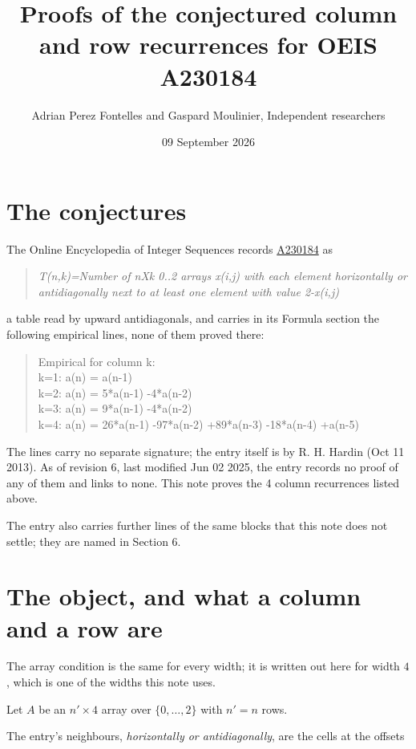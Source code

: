 \documentclass[11pt]{article}
\title{Proofs of the conjectured column and row recurrences for OEIS A230184}
\author{Adrian Perez Fontelles and Gaspard Moulinier, Independent researchers}
\date{09 September 2026}
\theoremstyle{definition}
\begin{document}
\maketitle
\section{The conjectures}

The Online Encyclopedia of Integer Sequences records \href{https://oeis.org/A230184}{A230184} as

\begin{quote}\itshape T(n,k)=Number of nXk 0..2 arrays x(i,j) with each element horizontally or antidiagonally next to at least one element with value 2-x(i,j)\end{quote}

a table read by upward antidiagonals, and carries in its Formula section the following empirical lines, none of them proved there:

\begin{quote}\ttfamily Empirical for column k:\\
k=1: a(n) = a(n-1)\\k=2: a(n) = 5*a(n-1) -4*a(n-2)\\k=3: a(n) = 9*a(n-1) -4*a(n-2)\\k=4: a(n) = 26*a(n-1) -97*a(n-2) +89*a(n-3) -18*a(n-4) +a(n-5)\end{quote}

The lines carry no separate signature; the entry itself is by R. H. Hardin (Oct 11 2013). As of revision 6, last modified Jun 02 2025, the entry records no proof of any of them and links to none. This note proves the 4 column recurrences listed above.

The entry also carries further lines of the same blocks that this note does not settle; they are named in Section 6.

\section{The object, and what a column and a row are}

The array condition is the same for every width; it is written out here for width $4$, which is one of the widths this note uses.

Let $A$ be an $n' \times 4$ array over $\{0,\dots,2\}$ with $n' = n$ rows.

The entry's neighbours, {\itshape horizontally or antidiagonally}, are the cells at the offsets
\end{document}
